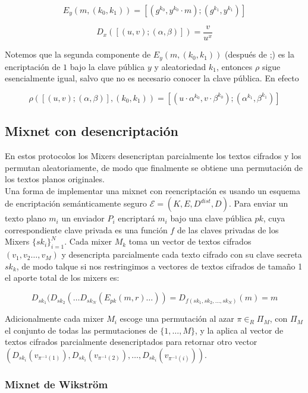 $$E_{y}(m,(k_{0},k_{1}))=[(g^{k_{0}},y^{k_{0}}\cdot m);(g^{k_{1}},y^{k_{1}})]$$


$$D_{x}([(u,v);(\alpha,\beta)])=\frac{v}{u^{x}}$$


Notemos que la segunda componente de $E_{y}(m,(k_{0},k_{1}))$ (después
de ;) es la encriptación de $1$ bajo la clave pública $y$ y aleatoriedad
$k_{1}$, entonces $\rho$ sigue esencialmente igual, salvo que no es necesario
conocer la clave pública. En efecto

$$
\rho([(u,v);(\alpha,\beta)],(k_{0},k_{1}))=
[(u\cdot \alpha^{k_{0}}, v\cdot \beta^{k_{0}});
 (\alpha^{k_{1}},\beta^{k_{1}})]
$$

\subsection{Mixnet con desencriptación}

En estos protocolos los Mixers desencriptan parcialmente los textos
cifrados y los permutan aleatoriamente, de modo que finalmente se
obtiene una permutación de los textos planos originales.\\
Una forma de implementar una mixnet con reencriptación es usando un
esquema de encriptación semánticamente seguro
$\mathcal{E}=(K,E,D^{dist},D)$. Para enviar un texto plano $m_{i}$ un enviador
$P_{i}$  encriptará $m_{i}$ bajo una clave
pública $pk$, cuya correspondiente clave privada es una función $f$
de las claves privadas de los Mixers $\{sk_{i}\}_{i=1}^{N}$.
Cada mixer $M_{k}$ toma un vector
de textos cifrados $(v_{1},v_{2}\ldots,v_{M})$ y desencripta parcialmente cada
texto cifrado con su clave secreta $sk_{k}$, de modo talque si nos restringimos
a vectores de textos cifrados de tamaño 1 el aporte
total de los mixers es:

\[
D_{sk_{1}}(D_{sk_{2}}(\ldots D_{sk_{N}}(E_{pk}(m,r)\ldots))=D_{f(sk_{1},sk_{2},\ldots,sk_{N})}(m)=m\]

Adicionalmente cada mixer $M_{i}$ escoge una permutación al azar
$\pi\in_{R}\Pi_{M}$, con $\Pi_{M}$ el conjunto
de todas las permutaciones de $\{1,\ldots,M\}$, y la aplica al vector
de textos cifrados parcialmente desencriptados para retornar otro
vector $(D_{sk_{i}}(v_{\pi^{-1}(1)}),D_{sk_{i}}(v_{\pi^{-1}(2)}),\ldots,D_{sk_{i}}(v_{\pi^{-1}(i)}))$.

\subsubsection{Mixnet de Wikstr\"om}

